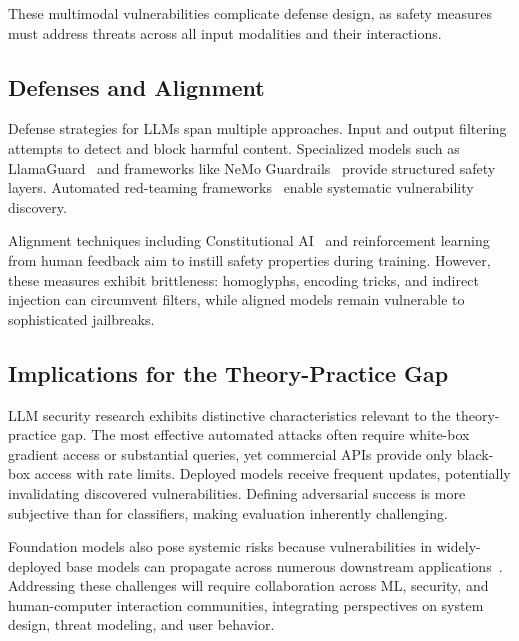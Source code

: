 \documentclass[11pt,a4paper]{article}
\begin{document}
These multimodal vulnerabilities complicate defense design, as safety measures must address threats across all input modalities and their interactions.

\subsection{Defenses and Alignment}

Defense strategies for LLMs span multiple approaches. Input and output filtering attempts to detect and block harmful content. Specialized models such as LlamaGuard~\citep{inan2023llamaguard} and frameworks like NeMo Guardrails~\citep{rebedea2023nemo} provide structured safety layers. Automated red-teaming frameworks~\citep{bertrand2024rainbow, hong2024curiosity} enable systematic vulnerability discovery.

Alignment techniques including Constitutional AI~\citep{bai2022constitutional} and reinforcement learning from human feedback aim to instill safety properties during training. However, these measures exhibit brittleness: homoglyphs, encoding tricks, and indirect injection can circumvent filters, while aligned models remain vulnerable to sophisticated jailbreaks.

\subsection{Implications for the Theory-Practice Gap}

LLM security research exhibits distinctive characteristics relevant to the theory-practice gap. The most effective automated attacks often require white-box gradient access or substantial queries, yet commercial APIs provide only black-box access with rate limits. Deployed models receive frequent updates, potentially invalidating discovered vulnerabilities. Defining adversarial success is more subjective than for classifiers, making evaluation inherently challenging.

Foundation models also pose systemic risks because vulnerabilities in widely-deployed base models can propagate across numerous downstream applications~\citep{bommasani2021opportunities}. Addressing these challenges will require collaboration across ML, security, and human-computer interaction communities, integrating perspectives on system design, threat modeling, and user behavior.

\end{document}
